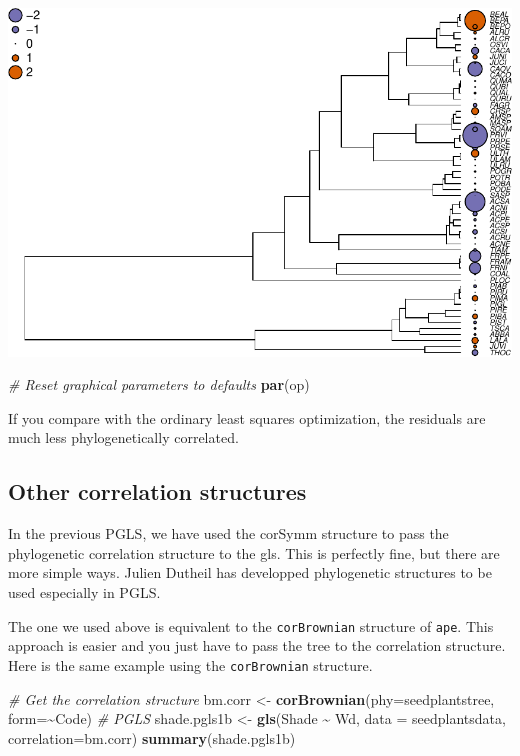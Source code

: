 \documentclass[
]{book}
\newenvironment{Shaded}{\begin{snugshade}}{\end{snugshade}}
\newcommand{\AttributeTok}[1]{\textcolor[rgb]{0.13,0.29,0.53}{#1}}
\newcommand{\CommentTok}[1]{\textcolor[rgb]{0.56,0.35,0.01}{\textit{#1}}}
\newcommand{\FunctionTok}[1]{\textcolor[rgb]{0.13,0.29,0.53}{\textbf{#1}}}
\newcommand{\NormalTok}[1]{#1}
\newcommand{\OtherTok}[1]{\textcolor[rgb]{0.56,0.35,0.01}{#1}}
\newcommand{\SpecialCharTok}[1]{\textcolor[rgb]{0.81,0.36,0.00}{\textbf{#1}}}
\begin{document}
\includegraphics{pcm-workshop_files/figure-latex/pgls residual fit-1.pdf}

\begin{Shaded}
\begin{Highlighting}[]
\CommentTok{\# Reset graphical parameters to defaults}
\FunctionTok{par}\NormalTok{(op) }
\end{Highlighting}
\end{Shaded}

If you compare with the ordinary least squares optimization, the residuals are much less phylogenetically correlated.

\subsection{Other correlation structures}\label{other-correlation-structures}

In the previous PGLS, we have used the corSymm structure to pass the phylogenetic correlation structure to the gls. This is perfectly fine, but there are more simple ways. Julien Dutheil has developped phylogenetic structures to be used especially in PGLS.

The one we used above is equivalent to the \texttt{corBrownian} structure of \texttt{ape}. This approach is easier and you just have to pass the tree to the correlation structure. Here is the same example using the \texttt{corBrownian} structure.

\begin{Shaded}
\begin{Highlighting}[]
\CommentTok{\# Get the correlation structure}
\NormalTok{bm.corr }\OtherTok{\textless{}{-}} \FunctionTok{corBrownian}\NormalTok{(}\AttributeTok{phy=}\NormalTok{seedplantstree, }\AttributeTok{form=}\SpecialCharTok{\textasciitilde{}}\NormalTok{Code)}
\CommentTok{\# PGLS}
\NormalTok{shade.pgls1b }\OtherTok{\textless{}{-}} \FunctionTok{gls}\NormalTok{(Shade }\SpecialCharTok{\textasciitilde{}}\NormalTok{ Wd, }\AttributeTok{data =}\NormalTok{ seedplantsdata, }\AttributeTok{correlation=}\NormalTok{bm.corr)}
\FunctionTok{summary}\NormalTok{(shade.pgls1b)}
\end{Highlighting}
\end{Shaded}
\end{document}
